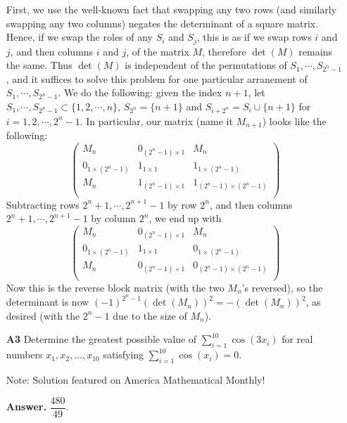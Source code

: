\documentclass[11pt,a4paper]{article}
\newcommand{\<}{\langle}
\renewcommand{\>}{\rangle}
\begin{document}
\begin{enumerate}
	First, we use the well-known fact that swapping any two rows (and similarly swapping any two columns) negates the determinant of a square matrix. Hence, if we swap the roles of any $S_i$ and $S_j$, 
	this is as if we swap rows $i$ and $j$, and then columns $i$ and $j$, of the matrix $M$, 
	therefore $\det(M)$ remains the same. 
	Thus $\det(M)$ is independent of the permutations of $S_1, \cdots, S_{2^n-1}$, and it suffices to solve this problem for one particular arranement of $S_1, \cdots, S_{2^n-1}$. 
	We do the following: given the index $n+1$, let $S_1, \cdots, S_{2^n-1}\subset \{1, 2, \cdots, n\}$, 
	$S_{2^n}=\{n+1\}$ and $S_{i+2^n}=S_i\cup\{n+1\}$ for $i=1, 2, \cdots, 2^n-1$. In particular, 
	our matrix (name it $M_{n+1}$) looks like the following: 
	\[
	\begin{pmatrix}
		M_n & 0_{(2^n-1)\times 1} & M_n\\
		0_{1\times (2^n-1)} & 1_{1\times 1} & 1_{1\times (2^n-1)}\\
		M_n & 1_{(2^n-1)\times 1} & 1_{(2^n-1)\times (2^n - 1)}\\
	\end{pmatrix}
	\]
	Subtracting rows $2^n+1, \cdots, 2^{n+1}-1$ by row $2^n$, 
	and then columns $2^n+1, \cdots, 2^{n+1}-1$ by column $2^n$, we end up with 
	\[
	\begin{pmatrix}
		M_n & 0_{(2^n-1)\times 1} & M_n\\
		0_{1\times (2^n-1)} & 1_{1\times 1} & 0_{1\times (2^n-1)}\\
		M_n & 0_{(2^n-1)\times 1} & 0_{(2^n-1)\times (2^n - 1)}\\
	\end{pmatrix}
	\]
	Now this is the reverse block matrix (with the two $M_n$'s reversed), so the determinant is now $(-1)^{2^n-1}(\det(M_n))^2=-(\det(M_n))^2$, as desired (with the $2^n-1$ due to the size of $M_n$). 
	
	\item[\textbf{A3}] 
	Determine the greatest possible value of $\sum_{i = 1}^{10} \cos(3x_i)$ for real numbers $x_1, x_2, \dots, x_{10}$ satisfying $\sum_{i = 1}^{10} \cos(x_i) = 0$.
	
	Note: Solution featured on America Mathematical Monthly!
	
	\textbf{Answer.} $\dfrac{480}{49}$. 
	

\end{enumerate}
\end{document}
